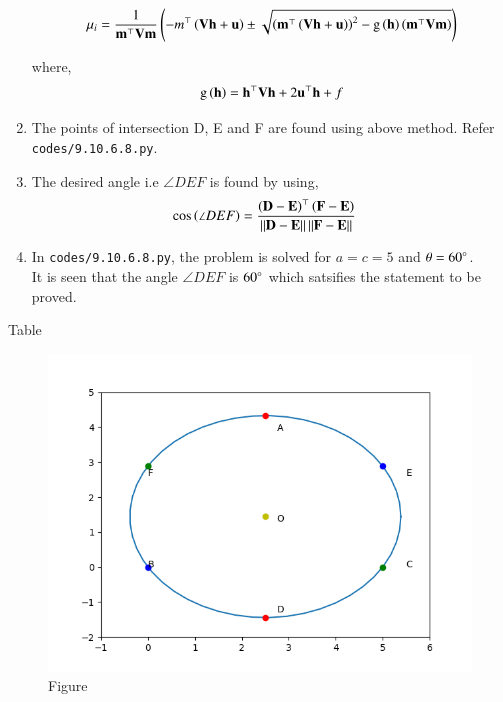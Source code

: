 \documentclass[journal,12pt,twocolumn]{IEEEtran}
\begin{document}
\begin{enumerate}
	\begin{multline}
        \mu_i = \frac{1}{\mathbf{m}^{\top}\mathbf{V}\mathbf{m}} \left(-m^{\top}\left(\mathbf{V}\mathbf{h}+\mathbf{u}\right) \pm \sqrt{\left(\mathbf{m}^{\top}\left(\mathbf{V}\mathbf{h}+\mathbf{u}\right)\right)^2 - \text{g}\left(\mathbf{h}\right)\left(\mathbf{m}^{\top}\mathbf{V}\mathbf{m}\right)}\right)
\end{multline}

where,
\begin{align}
        \text{g}\left(\mathbf{h}\right) = \mathbf{h}^{\top}\mathbf{V}\mathbf{h} + 2\mathbf{u}^{\top}\mathbf{h} +f
\end{align}

\item The points of intersection D, E and F are found using above method. Refer \texttt{codes/9.10.6.8.py}.

\item The desired angle i.e $\angle DEF$ is found by using,
	\begin{align}
		\cos\left(\angle DEF\right) &= \frac{ \left(\mathbf{D}-\mathbf{E}\right)^{\top} \left( \mathbf{F}-\mathbf{E}\right) } { \left\lVert\mathbf{D}-\mathbf{E}\right\rVert \left\lVert\mathbf{F}-\mathbf{E}\right\rVert }
	\end{align}

\item In \texttt{codes/9.10.6.8.py}, the problem is solved for $a =c = 5$ and $ \theta = 60 \degree$.\\
	It is seen that the angle $\angle DEF$ is $ 60 \degree$ which satsifies the statement to be proved.
\end{enumerate}

\begin{table}[h!]
\centering
        
        \caption{Table}
        \label{tab:}
\end{table}

\begin{figure}[h!]
  \centering
   \includegraphics[width=\linewidth,height = \linewidth]{figs/Figure_1.png}
   \caption{Figure}
   \label{fig:}
\end{figure}
\end{document}
